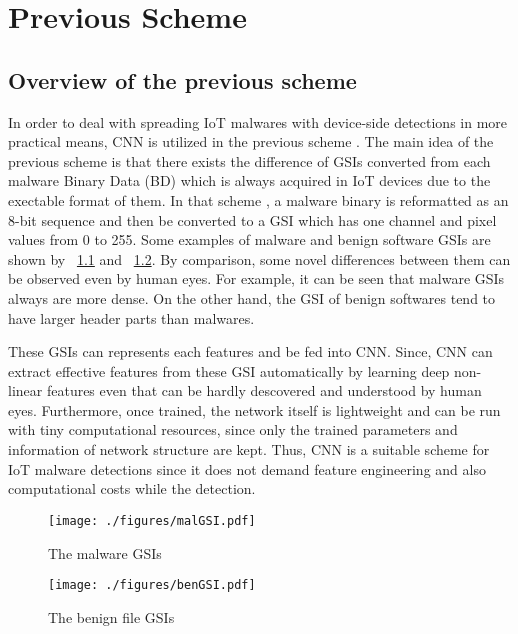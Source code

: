 \chapter{Previous Scheme}\label{sec:previous_scheme}
\section{Overview of the previous scheme} 
In order to deal with spreading IoT malwares with device-side detections in more practical means, CNN is utilized in the previous scheme \cite{previous}.
The main idea of the previous scheme is that there exists the difference of GSIs converted from each malware Binary Data (BD) which is always acquired in IoT devices due to the exectable format of them.
In that scheme \cite{previous}, a malware binary is reformatted as an 8-bit sequence and then be converted to a GSI which has one channel and pixel values from 0 to 255.
Some examples of malware and benign software GSIs are shown by \figurename~\ref{fig:malGSI} and \figurename~\ref{fig:benGSI}.
By comparison, some novel differences between them can be observed even by human eyes.
For example, it can be seen that malware GSIs always are more dense.
On the other hand, the GSI of benign softwares tend to have larger header parts than malwares.

These GSIs can represents each features and be fed into CNN.
Since, CNN can extract effective features from these GSI automatically by learning deep non-linear features even that can be hardly descovered and understood by human eyes.
Furthermore, once trained, the network itself is lightweight and can be run with tiny computational resources, since only the trained parameters and information of network structure are kept.
Thus, CNN is a suitable scheme for IoT malware detections since it does not demand feature engineering and also computational costs while the detection.

\begin{figure}[p]
 \centering
 \hspace{-55pt}
 \texttt{[image: ./figures/malGSI.pdf]}
 \caption{The malware GSIs} 
 \label{fig:malGSI}
\end{figure}
\begin{figure}[p]
 \centering
 \hspace{-55pt}
 \texttt{[image: ./figures/benGSI.pdf]}
 \caption{The benign file GSIs} 
 \label{fig:benGSI}
\end{figure}
\afterpage{\clearpage}
\newpage

